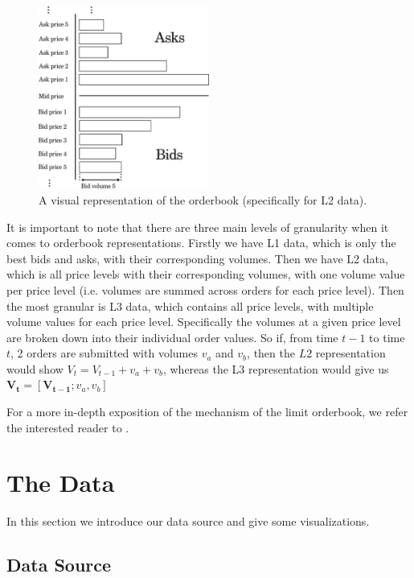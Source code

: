 \begin{figure}[htpb]
    \centering
    \includegraphics[width=0.5\textwidth]{./images/orderbook.pdf}
    \caption{A visual representation of the orderbook (specifically for L2 data).}
    \label{fig:orderbook}
\end{figure}

It is important to note that there are three main levels of granularity 
when it comes to orderbook representations.
Firstly we have L1 data, which is only the best bids and asks, with their corresponding volumes.
Then we have L2 data, which is all price levels with their corresponding volumes, with one volume value
per price level (i.e. volumes are summed across orders for each price level). Then the most granular is L3 data,
which contains all price levels, with multiple volume values for each price level. Specifically the volumes at a given price
level are broken down into their individual order values. So if, from time $t-1$ to time $t$, 2 orders
are submitted with volumes $v_a$ and $v_b$, then the $L2$ representation would show $V_t = V_{t-1} + v_a + v_b$,
whereas the L3 representation would give us  $\bm{V_t} = [\bm{V_{t-1}}; v_a, v_b]$

For a more in-depth exposition of the mechanism of the limit orderbook, we refer the interested reader to \cite{MARTIN2013}.


\section{The Data}
In this section we introduce our data source and give some visualizations.

\subsection{Data Source}

